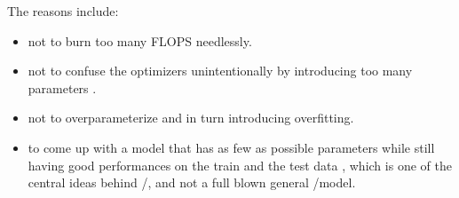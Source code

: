 The reasons include:
\begin{itemize}
  \item not to burn too many \ac{FLOPS} needlessly.
  \item not to confuse the optimizers unintentionally by introducing too many parameters \cite{Sankararaman2019}.
  \item not to overparameterize and in turn introducing overfitting\cite{Bishop2006}\cite{Goodfellow2016}\cite{ShalevShwartz2014}.
  \item to come up with a model that has as few as possible parameters while still having 
  good performances on the train and the test data , which is one of the central ideas behind 
  \du/\au\cite{Shechtman2015}\index{\du}\index{\au}, and not a full blown general \ml/\dl model.
\end{itemize}

